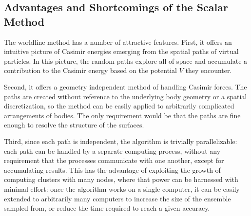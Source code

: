 
\subsection{Advantages and Shortcomings of the Scalar Method}

The worldline method has a number of attractive features.  
First, it offers an intuitive picture of Casimir energies emerging from the spatial paths 
of virtual particles.   In this picture, the random paths explore all of space
and accumulate a contribution to the Casimir energy based on the potential $V$ they encounter.

Second, it offers a geometry independent method of handling Casimir forces.  The paths are 
created without reference to the underlying body geometry or a spatial discretization, so the method can be easily applied to arbitrarily
complicated arrangements of bodies.  The only requirement would be that the paths are fine enough
to resolve the structure of the surfaces.  

Third, since each path is independent, the algorithm is trivially parallelizable: each path
can be handled by a separate computing process, without any requirement that the processes communicate
with one another, except for accumulating results.  This has the advantage of exploiting the growth of computing clusters with many nodes,
where that power can be harnessed with minimal effort: once the algorithm works on a single computer,
it can be easily extended to arbitrarily many computers to increase the size of the ensemble sampled
from, or reduce the time required to reach a given accuracy.  



